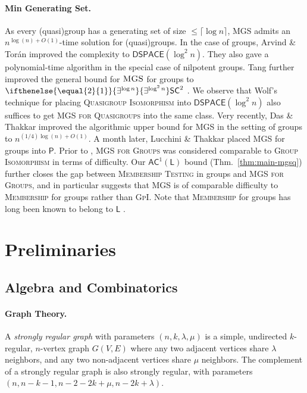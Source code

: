 \documentclass{article}
\newcommand{\algprobm}[1]{\textsc{#1}\xspace}
\newcommand{\betacc}[1]{\ifthenelse{\equal{#1}{1}}{\exists^{\log n}}{\exists^{\log^{#1}n}}} %
\newcommand{\Thm}[1]{Thm.~\ref{#1}\xspace}
\newcommand*{\ComplexityClass}[1]{\ensuremath{\mathsf{#1}}\xspace}
\newcommand*{\LogSpace}{\ComplexityClass{L}}
\newcommand{\AC}{\ComplexityClass{AC}}
\begin{document}
\paragraph{Min Generating Set.} As every (quasi)group has a generating set of size $\leq \lceil \log n \rceil$, \algprobm{MGS} admits an $n^{\log(n) + O(1)}$-time solution for (quasi)groups. In the case of groups, Arvind \& Tor\'an  \cite{ArvindToran} improved the complexity to $\mathsf{DSPACE}(\log^{2} n)$. They also gave a polynomial-time algorithm in the special case of nilpotent groups. Tang further improved the general bound for $\algprobm{MGS}$ for groups to $\betacc{2}\mathsf{SC}^{2}$ \cite{TangThesis}. We observe that Wolf's technique for placing \algprobm{Quasigroup Isomorphism} into $\mathsf{DSPACE}(\log^2 n)$ also suffices to get \algprobm{MGS for Quasigroups} into the same class. Very recently, Das \& Thakkar \cite{DasThakkar} improved the algorithmic upper bound for \algprobm{MGS} in the setting of groups to $n^{(1/4) \log(n) + O(1)}$. A month later, Lucchini \& Thakkar \cite{LucchiniThakkar} placed  \algprobm{MGS} for groups into $\mathsf{P}$. Prior to \cite{LucchiniThakkar}, \algprobm{MGS for Groups} was considered comparable to \algprobm{Group Isomorphism} in terms of difficulty. Our $\AC^{1}(\LogSpace)$ bound  (\Thm{thm:main-mgsq}) further closes the gap between \algprobm{Membership Testing} in groups and \algprobm{MGS for Groups}, and in particular suggests that \algprobm{MGS} is of comparable difficulty to \algprobm{Membership} for groups rather than \algprobm{GpI}. Note that \algprobm{Membership} for groups has long been known to belong to $\LogSpace$ \cite{BarringtonMcKenzie, Reingold}.

\section{Preliminaries}

\subsection{Algebra and Combinatorics}\label{sec:algebraprelims}

\paragraph{Graph Theory.} A \textit{strongly regular graph} with parameters $(n, k, \lambda, \mu)$ is a simple, undirected $k$-regular, $n$-vertex graph $G(V, E)$ where any two adjacent vertices share $\lambda$ neighbors, and any two non-adjacent vertices share $\mu$ neighbors. The complement of a strongly regular graph is also strongly regular, with parameters $(n, n-k-1, n-2-2k+\mu, n-2k+\lambda)$. \\
\end{document}
